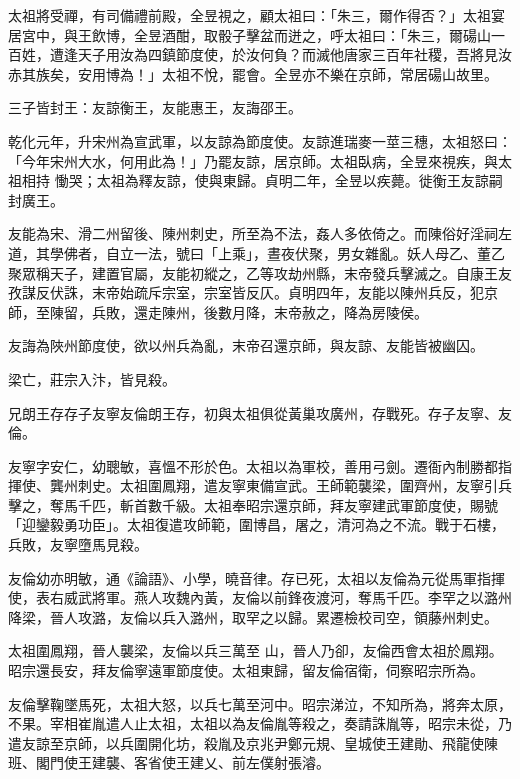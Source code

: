 \begin{pinyinscope}
 太祖將受禪，有司備禮前殿，全昱視之，顧太祖曰：「朱三，爾作得否？」太祖宴居宮中，與王飲博，全昱酒酣，取骰子擊盆而迸之，呼太祖曰：「朱三，爾碭山一百姓，遭逢天子用汝為四鎮節度使，於汝何負？而滅他唐家三百年社稷，吾將見汝赤其族矣，安用博為！」太祖不悅，罷會。全昱亦不樂在京師，常居碭山故里。



 三子皆封王：友諒衡王，友能惠王，友誨邵王。



 乾化元年，升宋州為宣武軍，以友諒為節度使。友諒進瑞麥一莖三穗，太祖怒曰：「今年宋州大水，何用此為！」乃罷友諒，居京師。太祖臥病，全昱來視疾，與太祖相持
 慟哭；太祖為釋友諒，使與東歸。貞明二年，全昱以疾薨。徙衡王友諒嗣封廣王。



 友能為宋、滑二州留後、陳州刺史，所至為不法，姦人多依倚之。而陳俗好淫祠左道，其學佛者，自立一法，號曰「上乘」，晝夜伏聚，男女雜亂。妖人母乙、董乙聚眾稱天子，建置官屬，友能初縱之，乙等攻劫州縣，末帝發兵擊滅之。自康王友孜謀反伏誅，末帝始疏斥宗室，宗室皆反仄。貞明四年，友能以陳州兵反，犯京師，至陳留，兵敗，還走陳州，後數月降，末帝赦之，降為房陵侯。



 友誨為陜州節度使，欲以州兵為亂，末帝召還京師，與友諒、友能皆被幽囚。



 梁亡，莊宗入汴，皆見殺。



 兄朗王存存子友寧友倫朗王存，初與太祖俱從黃巢攻廣州，存戰死。存子友寧、友倫。



 友寧字安仁，幼聰敏，喜慍不形於色。太祖以為軍校，善用弓劍。遷衙內制勝都指揮使、龔州刺史。太祖圍鳳翔，遣友寧東備宣武。王師範襲梁，圍齊州，友寧引兵擊之，奪馬千匹，斬首數千級。太祖奉昭宗還京師，拜友寧建武軍節度使，賜號「迎鑾毅勇功臣」。太祖復遣攻師範，圍博昌，屠之，清河為之不流。戰于石樓，兵敗，友寧墮馬見殺。



 友倫幼亦明敏，通《論語》、小學，曉音律。存已死，太祖以友倫為元從馬軍指揮使，表右威武將軍。燕人攻魏內黃，友倫以前鋒夜渡河，奪馬千匹。李罕之以潞州
 降梁，晉人攻潞，友倫以兵入潞州，取罕之以歸。累遷檢校司空，領藤州刺史。


太祖圍鳳翔，晉人襲梁，友倫以兵三萬至
 山，晉人乃卻，友倫西會太祖於鳳翔。昭宗還長安，拜友倫寧遠軍節度使。太祖東歸，留友倫宿衛，伺察昭宗所為。



 友倫擊鞠墜馬死，太祖大怒，以兵七萬至河中。昭宗涕泣，不知所為，將奔太原，不果。宰相崔胤遣人止太祖，太祖以為友倫胤等殺之，奏請誅胤等，昭宗未從，乃遣友諒至京師，以兵圍開化坊，殺胤及京兆尹鄭元規、皇城使王建勛、飛龍使陳班、閣門使王建襲、客省使王建乂、前左僕射張濬。




\end{pinyinscope}
